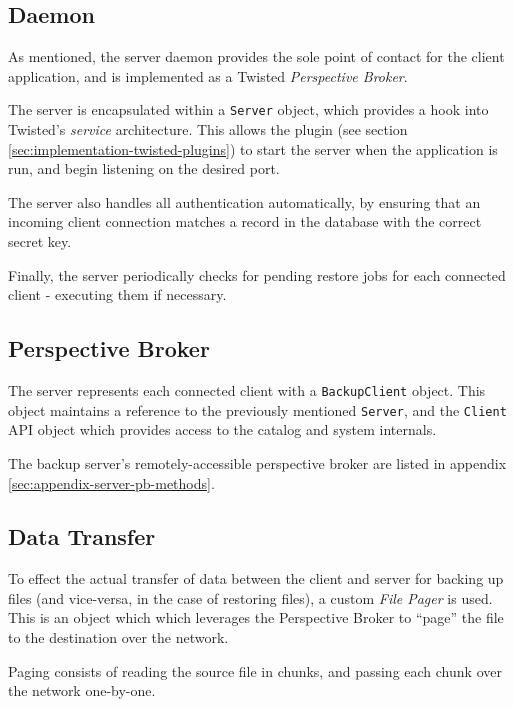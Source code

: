 \subsection{Daemon}
\label{sec:implementation-server-daemon}

As mentioned, the server daemon provides the sole point of contact for the
client application, and is implemented as a Twisted \emph{Perspective Broker}.

The server is encapsulated within a \verb!Server! object, which provides a hook
into Twisted's \emph{service} architecture. This allows the plugin (see section
\ref{sec:implementation-twisted-plugins}) to start the server when the
application is run, and begin listening on the desired port.

The server also handles all authentication automatically, by ensuring that
an incoming client connection matches a record in the database with the correct
secret key.

Finally, the server periodically checks for pending restore jobs for each
connected client - executing them if necessary.

\subsection{Perspective Broker}
\label{sec:implementation-server-pb}

The server represents each connected client with a \verb!BackupClient! object.
This object maintains a reference to the previously mentioned \verb!Server!,
and the \verb!Client! API object which provides access to the catalog and
system internals.

The backup server's remotely-accessible perspective broker are listed in
appendix \ref{sec:appendix-server-pb-methods}.

\subsection{Data Transfer}
\label{sec:implementation-server-transfer}

To effect the actual transfer of data between the client and server for backing
up files (and vice-versa, in the case of restoring files), a custom \emph{File
Pager} is used. This is an object which which leverages the Perspective Broker
to ``page'' the file to the destination over the network.

Paging consists of reading the source file in chunks, and passing each chunk
over the network one-by-one.

